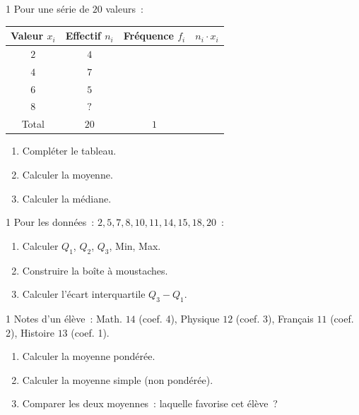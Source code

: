 \begin{exo}{1}
Pour une s\'erie de $20$ valeurs~:
\begin{center}
\begin{tabular}{|c|c|c|c|}
\hline
\rowcolor{BN!10}
Valeur $x_i$ & Effectif $n_i$ & Fr\'equence $f_i$ & $n_i\cdot x_i$ \\
\hline
$2$ & $4$ & & \\
$4$ & $7$ & & \\
$6$ & $5$ & & \\
$8$ & $?$ & & \\
\hline
Total & $20$ & $1$ & \\
\hline
\end{tabular}
\end{center}
\begin{enumerate}
  \item Compl\'eter le tableau.
  \item Calculer la moyenne.
  \item Calculer la m\'ediane.
\end{enumerate}
\end{exo}

\begin{exo}{1}
Pour les donn\'ees~: $2, 5, 7, 8, 10, 11, 14, 15, 18, 20$~:
\begin{enumerate}
  \item Calculer $Q_1$, $Q_2$, $Q_3$, Min, Max.
  \item Construire la bo\^ite \`a moustaches.
  \item Calculer l'\'ecart interquartile $Q_3-Q_1$.
\end{enumerate}
\end{exo}

\begin{exo}{1}
Notes d'un \'el\`eve~:
Math. $14$ (coef. 4), Physique $12$ (coef. 3), Fran\c cais $11$ (coef. 2),
Histoire $13$ (coef. 1).
\begin{enumerate}
  \item Calculer la moyenne pond\'er\'ee.
  \item Calculer la moyenne simple (non pond\'er\'ee).
  \item Comparer les deux moyennes~: laquelle favorise cet \'el\`eve~?
\end{enumerate}
\end{exo}

